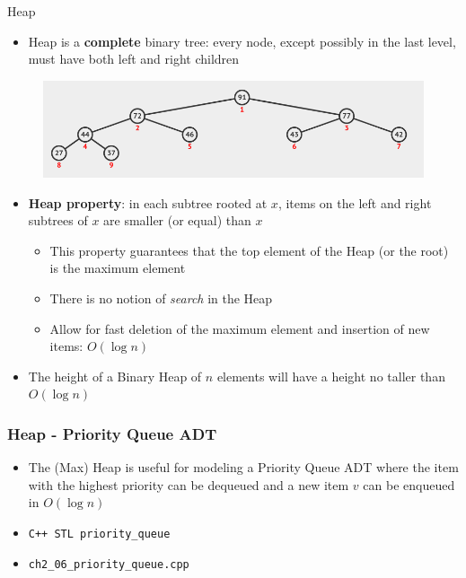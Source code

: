 \documentclass{beamer}
\begin{document}
\begin{frame}[fragile]{Heap}
    \begin{itemize}
        \item Heap is a \textbf{complete} binary tree: every node, except possibly in the last level, must have both left and right children
    \end{itemize}
	\begin{figure}
        \centering
        \includegraphics[scale=0.2]{imgs/2.3/heap/heap.png}
    \end{figure}
    
	\begin{itemize}
        \item \textbf{Heap property}: in each subtree rooted at $x$, items on the left and right subtrees of $x$ are smaller (or equal) than $x$
            \begin{itemize}
                \vspace{0.3cm}
                \item This property guarantees that the top element of the Heap (or the root) is the maximum element
                \item There is no notion of \textit{search} in the Heap
                \item Allow for fast deletion of the maximum element and insertion of new items: $O(\log n)$
            \end{itemize}
		\item The height of a Binary Heap of $n$ elements will have a height no taller than $O(\log n)$
    \end{itemize}
\end{frame}

\begin{frame}[fragile]
\frametitle{Heap - Priority Queue ADT}
	\begin{itemize}
		\item The (Max) Heap is useful for modeling a Priority Queue ADT where the item with the highest priority can be dequeued and a new item $v$ can be enqueued in $O(\log n)$
		\item \verb|C++ STL priority_queue|
		\item \color{red} \verb|ch2_06_priority_queue.cpp| \color{black}
	\end{itemize}
\end{frame}
\end{document}
